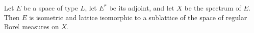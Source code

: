 Let $E$ be a space of type $L$, let $E^{*}$ be its adjoint, and let $X$ be the spectrum of $E$. Then $E$ is isometric and lattice isomorphic to a sublattice of the space of regular Borel measures on $X$.
